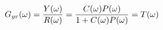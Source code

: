 \documentclass[preview]{standalone}
\begin{document}
\begin{align*}
\special{dvisvgm:raw <g id='unique000'>}G_{yr}(\omega)=\frac{Y(\omega)}{R(\omega)}=\frac{C(\omega)P(\omega)}{1+C(\omega)P(\omega)}=T(\omega)\special{dvisvgm:raw </g>}
\end{align*}
\end{document}
